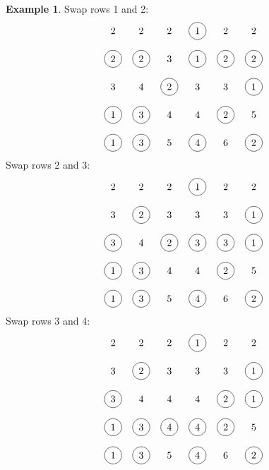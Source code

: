 \documentclass[submission]{FPSAC2018}
\newcommand{\0}{\phantom{c}}
\theoremstyle{plain}
\theoremstyle{definition}
\newtheorem{example}[thm]{Example}
\numberwithin{equation}{section}
\begin{document}
\begin{example}
\noindent Swap rows 1 and 2:
\[
\begin{tikzpicture}\node at (0, 5){2};\node at (1, 5){2};\node at (2, 5){2};\node[circle, draw=black] at (3, 5){1};\node at (4, 5){2};\node at (5, 5){2};\node[circle, draw=black] at (0, 4){2};\node[circle, draw=black] at (1, 4){2};\node at (2, 4){3};\node[circle, draw=black] at (3, 4){1};\node[circle, draw=black] at (4, 4){2};\node[circle, draw=black] at (5, 4){2};\node at (0, 3){3};\node at (1, 3){4};\node[circle, draw=black] at (2, 3){2};\node at (3, 3){3};\node at (4, 3){3};\node[circle, draw=black] at (5, 3){1};\node[circle, draw=black] at (0, 2){1};\node[circle, draw=black] at (1, 2){3};\node at (2, 2){4};\node at (3, 2){4};\node[circle, draw=black] at (4, 2){2};\node at (5, 2){5};\node[circle, draw=black] at (0, 1){1};\node[circle, draw=black] at (1, 1){3};\node at (2, 1){5};\node[circle, draw=black] at (3, 1){4};\node at (4, 1){6};\node[circle, draw=black] at (5, 1){2};\end{tikzpicture}
\]
Swap rows 2 and 3:
\[
\begin{tikzpicture}\node at (0, 5){2};\node at (1, 5){2};\node at (2, 5){2};\node[circle, draw=black] at (3, 5){1};\node at (4, 5){2};\node at (5, 5){2};\node at (0, 4){3};\node[circle, draw=black] at (1, 4){2};\node at (2, 4){3};\node at (3, 4){3};\node at (4, 4){3};\node[circle, draw=black] at (5, 4){1};\node[circle, draw=black] at (0, 3){3};\node at (1, 3){4};\node[circle, draw=black] at (2, 3){2};\node[circle, draw=black] at (3, 3){3};\node[circle, draw=black] at (4, 3){3};\node[circle, draw=black] at (5, 3){1};\node[circle, draw=black] at (0, 2){1};\node[circle, draw=black] at (1, 2){3};\node at (2, 2){4};\node at (3, 2){4};\node[circle, draw=black] at (4, 2){2};\node at (5, 2){5};\node[circle, draw=black] at (0, 1){1};\node[circle, draw=black] at (1, 1){3};\node at (2, 1){5};\node[circle, draw=black] at (3, 1){4};\node at (4, 1){6};\node[circle, draw=black] at (5, 1){2};\end{tikzpicture}
\]
Swap rows 3 and 4:
\[
\begin{tikzpicture}\node at (0, 5){2};\node at (1, 5){2};\node at (2, 5){2};\node[circle, draw=black] at (3, 5){1};\node at (4, 5){2};\node at (5, 5){2};\node at (0, 4){3};\node[circle, draw=black] at (1, 4){2};\node at (2, 4){3};\node at (3, 4){3};\node at (4, 4){3};\node[circle, draw=black] at (5, 4){1};\node[circle, draw=black] at (0, 3){3};\node at (1, 3){4};\node at (2, 3){4};\node at (3, 3){4};\node[circle, draw=black] at (4, 3){2};\node[circle, draw=black] at (5, 3){1};\node[circle, draw=black] at (0, 2){1};\node[circle, draw=black] at (1, 2){3};\node[circle, draw=black] at (2, 2){4};\node[circle, draw=black] at (3, 2){4};\node[circle, draw=black] at (4, 2){2};\node at (5, 2){5};\node[circle, draw=black] at (0, 1){1};\node[circle, draw=black] at (1, 1){3};\node at (2, 1){5};\node[circle, draw=black] at (3, 1){4};\node at (4, 1){6};\node[circle, draw=black] at (5, 1){2};\end{tikzpicture}
\]
\end{example}
\end{document}
